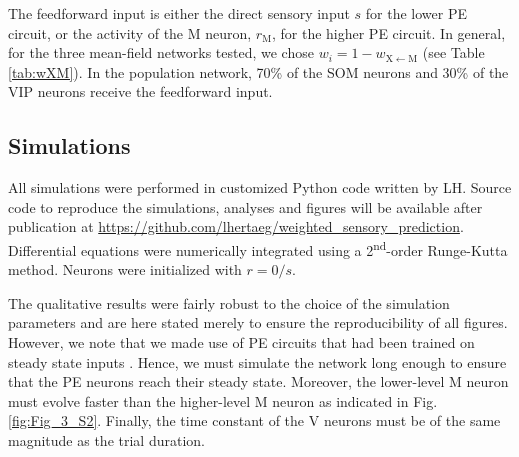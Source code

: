 \documentclass[10pt,a4paper,draft]{article}
\begin{document}
The feedforward input is either the direct sensory input $s$ for the lower PE circuit, or the activity of the M neuron, $r_\mathrm{M}$, for the higher PE circuit. In general, for the three mean-field networks tested, we chose $w_i = 1 - w_\mathrm{X\leftarrow M}$  (see Table \ref{tab:wXM}). In the population network, 70\% of the SOM neurons and 30\% of the VIP neurons receive the feedforward input.


\subsection{Simulations}
%
All simulations were performed in customized Python code written by LH. Source code to reproduce the simulations, analyses and figures will be available after publication at \url{https://github.com/lhertaeg/weighted_sensory_prediction}. Differential equations were numerically integrated using a 2\textsuperscript{nd}-order Runge-Kutta method. Neurons were initialized with $r=0/s$. 

The qualitative results were fairly robust to the choice of the simulation parameters and are here stated merely to ensure the reproducibility of all figures. However, we note that we made use of PE circuits that had been trained on steady state inputs \citep{hertag2022prediction}. Hence, we must simulate the network long enough to ensure that the PE neurons reach their steady state. Moreover, the lower-level M neuron must evolve faster than the higher-level M neuron as indicated in Fig. \ref{fig:Fig_3_S2}. Finally, the time constant of the V neurons must be of the same magnitude as the trial duration.
\end{document}
